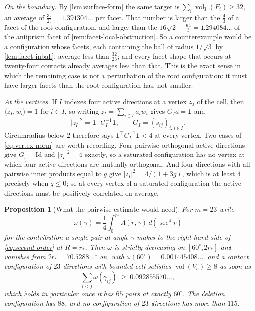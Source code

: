 \documentclass[11pt,reqno]{amsart}
\renewcommand{\_}{\origunderscore\allowbreak}
\numberwithin{equation}{section}
\theoremstyle{plain}
\newtheorem{prop}[thm]{Proposition}
\theoremstyle{definition}
\theoremstyle{remark}
\DeclareMathOperator{\vol}{vol}
\begin{document}
\emph{On the boundary.} By \cref{lem:surface-form} the same target is
$\sum_{i}\vol_3(F_i)\ge32$, an average of $\tfrac{32}{23}=1.391304\ldots$
per facet. That number is larger than the $\tfrac43$ of a facet of the
root configuration, and larger than the
$16\sqrt2-\tfrac{64}3=1.294084\ldots$ of the antiprism facet of
\cref{rem:facet-local-obstruction}. So a counterexample would be a
configuration whose facets, each containing the ball of radius
$1/\sqrt3$ by \cref{lem:facet-inball}, average less than
$\tfrac{32}{23}$; and every facet shape that occurs at twenty-four
contacts already averages less than that. This is the exact sense in
which the remaining case is not a perturbation of the root
configuration: it must have larger facets than the root configuration
has, not smaller.

\emph{At the vertices.} If $I$ indexes four active directions at a
vertex $z_I$ of the cell, then $\langle z_I,w_i\rangle=1$ for $i\in I$,
so writing $z_I=\sum_{i\in I}a_iw_i$ gives $G_Ia=\mathbf1$ and
\begin{equation}\label{eq:vertex-norm}
  |z_I|^2=\mathbf1^{\top}G_I^{-1}\mathbf1 ,
  \qquad G_I=(s_{ij})_{i,j\in I}.
\end{equation}
Circumradius below $2$ therefore says
$\mathbf1^{\top}G_I^{-1}\mathbf1<4$ at every vertex. Two cases of
\eqref{eq:vertex-norm} are worth recording. Four pairwise orthogonal
active directions give $G_I=\mathrm{Id}$ and $|z_I|^2=4$ exactly, so a
saturated configuration has no vertex at which four active directions
are mutually orthogonal. And four directions with all pairwise inner
products equal to $g$ give $|z_I|^2=4/(1+3g)$, which is at least $4$
precisely when $g\le0$; so at every vertex of a saturated configuration
the active directions must be positively correlated on average.

\begin{prop}[What the pairwise estimate would need]\label{prop:pair-budget}
For $m=23$ write
\[
  \omega(\gamma)=\frac14\int_0^{r_*}\Lambda(r,\gamma)\,d(\sec^4r)
\]
for the contribution a single pair at angle $\gamma$ makes to the
right-hand side of \eqref{eq:second-order} at $R=r_*$. Then $\omega$ is
strictly decreasing on $[60^\circ,2r_*]$ and vanishes from
$2r_*=70.5288\ldots^\circ$ on, with
$\omega(60^\circ)=0.001445408\ldots$, and a contact configuration of
$23$ directions with bounded cell satisfies $\vol(V_c)\ge8$ as soon as
\begin{equation}\label{eq:pair-budget}
  \sum_{i<j}\omega(\gamma_{ij})\;\ge\;0.092855570\ldots ,
\end{equation}
which holds in particular once it has $65$ pairs at exactly $60^\circ$.
The deletion configuration has $88$, and no configuration of $23$
directions has more than $115$.
\end{prop}
\end{document}
